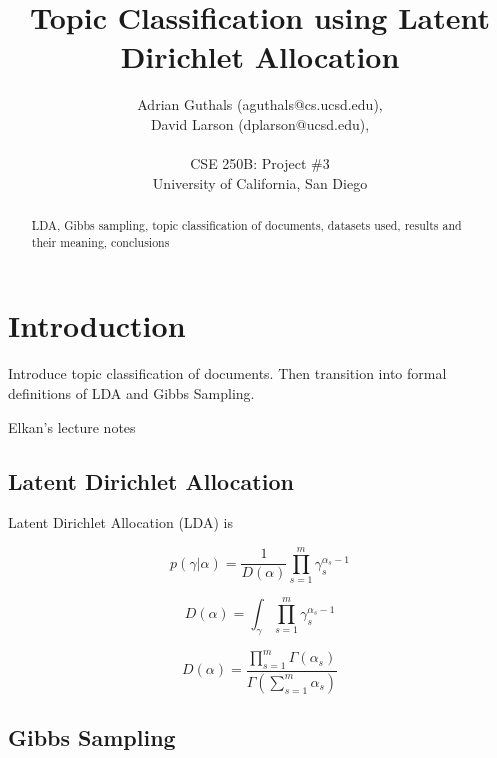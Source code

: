 \documentclass[10pt]{article}
\title{Topic Classification using Latent Dirichlet Allocation}
\author{Adrian Guthals (aguthals@cs.ucsd.edu),\\
David Larson (dplarson@ucsd.edu),\\
\\
CSE 250B: Project \#3 \\
University of California, San Diego \\
}
\begin{document}
\maketitle


\begin{abstract}
    LDA, Gibbs sampling, topic classification of documents, datasets used, results and their meaning, conclusions
\end{abstract}



\section{Introduction}
\label{sec:intro}

Introduce topic classification of documents. Then transition into formal definitions of LDA and Gibbs Sampling.

Elkan's lecture notes \cite{CSE250B}


\subsection{Latent Dirichlet Allocation}
\label{sec:lda}

Latent Dirichlet Allocation (LDA) is

\begin{equation}
    p(\gamma | \alpha) = \frac{1}{D(\alpha)} \prod_{s=1}^{m} \gamma_{s}^{\alpha_s - 1}
\end{equation}

\begin{equation}
    D(\alpha) = \int_{\gamma} \prod_{s=1}^m \gamma_s^{\alpha_s - 1}
\end{equation}

\begin{equation}
    D(\alpha) = \frac{\prod_{s=1}^m \Gamma(\alpha_s)}{\Gamma (\sum_{s=1}^m \alpha_s )}
\end{equation}



\subsection{Gibbs Sampling}
\label{sec:gibbs}
\end{document}

